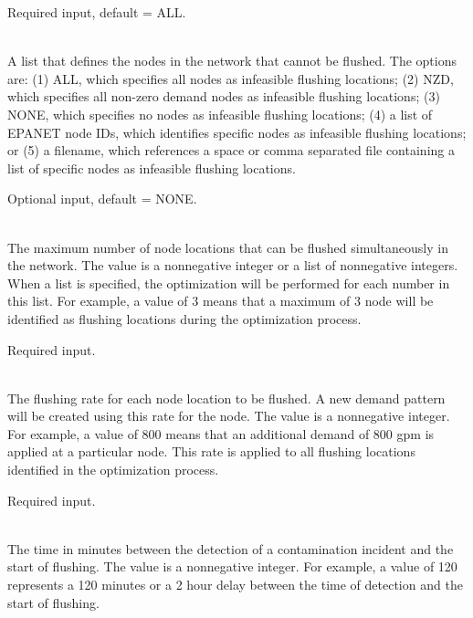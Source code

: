 \begin{description}[topsep=0pt,parsep=0.5em,itemsep=-0.4em]
\begin{description}[topsep=0pt,parsep=0.5em,itemsep=-0.4em]
\begin{description}[topsep=0pt,parsep=0.5em,itemsep=-0.4em]
                Required input, default = ALL.
      \item[{infeasible nodes}]\hfill
\\A list that defines the nodes in the network that cannot be flushed. 
                The options are: (1) ALL, which specifies all nodes as infeasible flushing locations;
                (2) NZD, which specifies all non-zero demand nodes as infeasible flushing locations;
                (3) NONE, which specifies no nodes as infeasible flushing locations;
                (4) a list of EPANET node IDs, which identifies specific nodes as infeasible flushing locations; or
                (5) a filename, which references a space or comma separated file containing a list of 
                specific nodes as infeasible flushing locations. 
                
                Optional input, default = NONE.
      \item[{max nodes}]\hfill
\\The maximum number of node locations that can be flushed simultaneously in the
                network. The value is a nonnegative integer or a list of
                nonnegative integers. When a list is specified, the optimization
                will be performed for each number in this list. For example, a value of 
                3 means that a maximum of 3 node will be identified as flushing locations 
                during the optimization process.
                
                Required input.
      \item[{rate}]\hfill
\\The flushing rate for each node location to be flushed. A new demand pattern 
                will be created using this rate for the node. The value is a nonnegative integer. 
                For example, a value of 800 means that an additional demand of 800 gpm is applied 
                at a particular node. This rate is applied to all flushing locations identified 
                in the optimization process.
                
                Required input.
      \item[{response time}]\hfill
\\The time in minutes between the detection of a contamination incident and 
                the start of flushing. The value is a nonnegative integer. For example, 
                a value of 120 represents a 120 minutes or a 2 hour delay between 
                the time of detection and the start of flushing.
                

\end{description}
\end{description}
\end{description}
